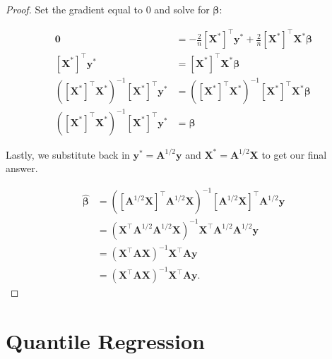 \begin{proof}
Set the gradient equal to 0 and solve for \(\boldsymbol{\beta}\):

\begin{align*}
\boldsymbol{0} & =  
- \frac{2}{n}\left[\boldsymbol{X}^*\right]^\top {\boldsymbol{y}}^*
+ \frac{2}{n} \left[\boldsymbol{X}^*\right]^\top{\boldsymbol{X}}^*\boldsymbol{\beta}
\\ \left[\boldsymbol{X}^*\right]^\top {\boldsymbol{y}}^* & =\left[\boldsymbol{X}^*\right]^\top{\boldsymbol{X}}^*\boldsymbol{\beta}
\\ \left( \left[\boldsymbol{X}^*\right]^\top{\boldsymbol{X}}^* \right)^{-1}\left[\boldsymbol{X}^*\right]^\top {\boldsymbol{y}}^* & =\left( \left[\boldsymbol{X}^*\right]^\top{\boldsymbol{X}}^* \right)^{-1} \left[\boldsymbol{X}^*\right]^\top{\boldsymbol{X}}^*\boldsymbol{\beta}
\\ \left( \left[\boldsymbol{X}^*\right]^\top{\boldsymbol{X}}^* \right)^{-1}\left[\boldsymbol{X}^*\right]^\top {\boldsymbol{y}}^* & = \boldsymbol{\beta}
\end{align*}

Lastly, we substitute back in \({\boldsymbol{y}}^* = {\boldsymbol{A}}^{1/2} \boldsymbol{y} \) and \({\boldsymbol{X}}^* = {\boldsymbol{A}}^{1/2} \boldsymbol{X}\) to get our final answer.


\begin{align*}
 \hat{\boldsymbol{\beta}} & =\left( \left[{\boldsymbol{A}}^{1/2} \boldsymbol{X}\right]^\top{\boldsymbol{A}}^{1/2} \boldsymbol{X} \right)^{-1}\left[{\boldsymbol{A}}^{1/2} \boldsymbol{X}\right]^\top {\boldsymbol{A}}^{1/2} \boldsymbol{y} 
\\  & =\left( \boldsymbol{X}^\top{\boldsymbol{A}}^{1/2}  {\boldsymbol{A}}^{1/2} \boldsymbol{X} \right)^{-1}\boldsymbol{X}^\top{\boldsymbol{A}}^{1/2}  {\boldsymbol{A}}^{1/2} \boldsymbol{y} 
\\  & =\left( \boldsymbol{X}^\top{\boldsymbol{A}} \boldsymbol{X} \right)^{-1}\boldsymbol{X}^\top{\boldsymbol{A}} \boldsymbol{y} 
\\  & =\left( \boldsymbol{X}^\top {\boldsymbol{A}} \boldsymbol{X} \right)^{-1}\boldsymbol{X}^\top \boldsymbol{A} \boldsymbol{y}.
\end{align*}

\end{proof}

\section{Quantile Regression}\label{linreg.sec.quant.reg}

